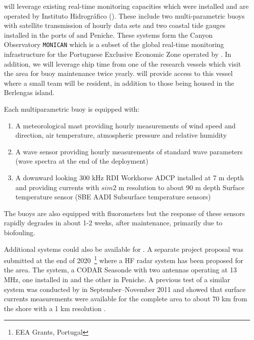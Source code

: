 \proj will leverage existing real-time monitoring capacities which were
installed and are operated by Instituto Hidrogr\'{a}fico (\inste). These
include two multi-parametric buoys with satellite transmission of hourly
data sets and two coastal tide gauges installed in the ports of \naz and
Peniche. These systems form the \naz Canyon Observatory \texttt{MONICAN}
which is a subset of the global real-time monitoring infrastructure for
the Portuguese Exclusive Economic Zone operated by \inst {}. In addition, we will leverage ship
time from one of the \inst research vessels which visit the \naz area
for buoy maintenance twice yearly. \inst will provide access to this
vessel where a small \proj team will be resident, in addition to those
being housed in the Berlengas island.

Each multiparametric buoy is equipped with:

\begin{enumerate}

  \item A meteorological mast providing hourly measurements of wind speed and
    direction, air temperature, atmospheric pressure and relative
    humidity

  \item A wave sensor providing hourly measurements of standard wave parameters
    (wave spectra at the end of the deployment)

  \item A downward looking 300 kHz RDI Workhorse ADCP installed at 7 m
    depth and providing currents with $sim 2$ m resolution to about 90 m
    depth Surface temperature sensor (SBE AADI Subsurface temperature
    sensors)

\end{enumerate}  


The buoys are also equipped with fluorometers but the response of these
sensors rapidly degrades in about 1-2 weeks, after maintenance,
primarily due to biofouling.

Additional systems could also be available for \proje. A separate
project proposal was submitted at the end of 2020~\footnote{EEA Grants,
  Portugal} where a HF radar system has been proposed for the \naz area.
The system, a CODAR Seasonde with two antennas operating at 13 MHz, one
installed in \naz and the other in Peniche. A previous test of a similar
system was conducted by \inst in September--November 2011 and showed
that surface currents measurements were available for the complete area
to about 70 km from the shore with a 1 km resolution .
 
